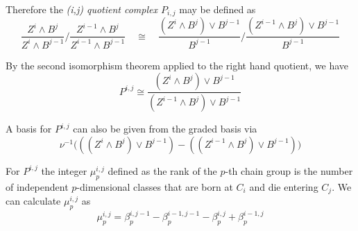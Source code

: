Therefore the {\em (i,j) quotient complex $P_{i,j}$} may be defined as 
\[
\frac{Z^i\wedge B^j}{Z^i\wedge B^{j-1}} \Big/\frac{Z^{i-1}\wedge B^j}{Z^{i-1}\wedge B^{j-1}}
\quad\cong\quad 
\frac{(Z^i\wedge B^j)\vee B^{j-1}}{B^{j-1}}  \Big/\frac{(Z^{i-1}\wedge B^j)\vee B^{j-1}}{B^{j-1}}
\]

By the second isomorphism theorem applied to the right hand quotient, we have 
\[
P^{i,j} \cong \frac{(Z^i\wedge B^j)\vee B^{j-1} } {(Z^{i-1}\wedge B^j)\vee B^{j-1}}
\]

A basis for $P^{i,j}$ can also be given from the graded basis via $$\nu^{-1}\big(((Z^i\wedge B^j)\vee B^{j-1}) - ((Z^{i-1}\wedge B^j)\vee B^{j-1})  \big)$$


For $P^{i,j}$ the integer $\mu^{i,j}_p$ defined as the rank of the $p$-th chain group is the number of independent $p$-dimensional classes that are born at $C_i$ and die entering $C_j$.  We can calculate $\mu_p^{i,j}$ as 
\[
\mu_p^{i,j} = \beta_p^{i,j-1}-\beta_p^{i-1,j-1}-\beta_p^{i,j}+\beta_p^{i-1,j}
\]

%
%
%
%


